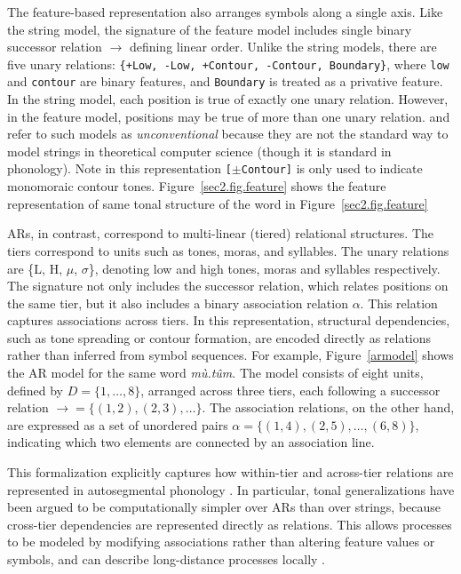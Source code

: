 \documentclass[11pt]{article}
\begin{document}


The feature-based representation also arranges symbols along a single axis.
Like the string model, the signature of the feature model
includes single binary successor relation $\rightarrow$ defining linear order.
Unlike the string models, there are five unary relations:
\texttt{\{+Low, -Low, +Contour, -Contour, Boundary\}},
where \texttt{low} and \texttt{contour} are binary features, 
and \texttt{Boundary} is treated as a privative feature.
In the string model, each position is true of exactly one unary relation.
However, in the feature model, positions may be true of more than one unary
relation.
\citet{strother2017using} and \citet{vu2018statistical} refer to such models as
\textit{unconventional} because they are not the standard way to model strings in
theoretical computer science (though it is standard in phonology).
Note in this representation \texttt{[$\pm$Contour]} is only used to indicate monomoraic
contour tones.
Figure~\ref{sec2.fig.feature} shows the feature representation of same tonal structure of the word in Figure~\ref{sec2.fig.feature}


ARs, in contrast, correspond to multi-linear (tiered) relational structures.
The tiers correspond to units such as tones, moras, and syllables.
The unary relations are \{L, H, \(\mu\), \(\sigma\)\},
denoting low and high tones, moras and syllables respectively.
The signature not only includes the successor relation,
which relates positions on the same tier,
but it also includes a binary  association relation $\alpha$.
This relation captures associations across tiers.
In this representation, structural dependencies,
such as tone spreading or contour formation,
are encoded directly as relations rather than inferred from symbol sequences.
For example, Figure~\ref{armodel} shows the AR model for the same word \textit{mù.tûm}. The model consists of eight units,
defined by $D=\{1,\ldots,8\}$, arranged across three tiers, each following
a successor relation $\rightarrow=\{(1,2),(2,3),\ldots\}$. The association
relations, on the other hand, are expressed as a set of unordered pairs
$\alpha=\{(1,4),(2,5),\ldots,(6,8)\}$, indicating which two elements are
connected by an association line.



This formalization explicitly captures how within-tier and across-tier
relations are represented in autosegmental phonology
\citep{goldsmith1976autosegmental}. In particular, tonal generalizations
have been argued to be computationally simpler over ARs than over strings,
because cross-tier dependencies are represented directly as relations. This
allows processes to be modeled by modifying associations rather than
altering feature values or symbols, and can describe long-distance
processes locally \citep{goldsmith1976autosegmental,jardine2017LocalNature}.
\end{document}
